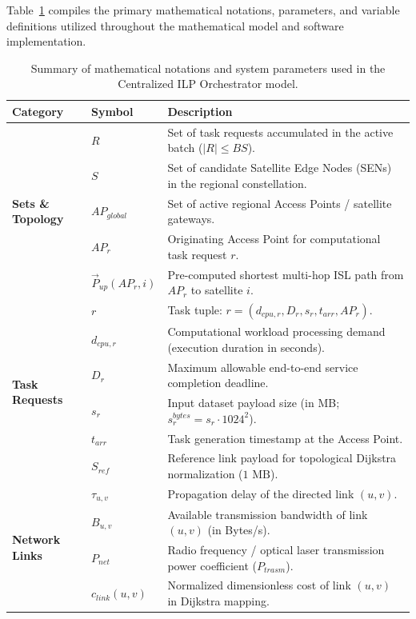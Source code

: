 Table~\ref{tab:system_notations} compiles the primary mathematical notations, parameters, and variable definitions utilized throughout the mathematical model and software implementation.

\begin{table}[htbp]
\centering
\small
\caption{Summary of mathematical notations and system parameters used in the Centralized ILP Orchestrator model.}
\label{tab:system_notations}
\begin{tabular}{@{}llp{9.2cm}@{}}
\toprule
\textbf{Category} & \textbf{Symbol} & \textbf{Description} \\
\midrule
\multirow{5}{*}{\textbf{Sets \& Topology}}
& $R$ & Set of task requests accumulated in the active batch ($|R| \le BS$). \\
& $S$ & Set of candidate Satellite Edge Nodes (SENs) in the regional constellation. \\
& $AP_{global}$ & Set of active regional Access Points / satellite gateways. \\
& $AP_r$ & Originating Access Point for computational task request $r$. \\
& $\vec{P}_{up}(AP_r, i)$ & Pre-computed shortest multi-hop ISL path from $AP_r$ to satellite $i$. \\
\midrule
\multirow{6}{*}{\textbf{Task Requests}}
& $r$ & Task tuple: $r = (d_{cpu,r}, D_r, s_r, t_{arr}, AP_r)$. \\
& $d_{cpu,r}$ & Computational workload processing demand (execution duration in seconds). \\
& $D_r$ & Maximum allowable end-to-end service completion deadline. \\
& $s_r$ & Input dataset payload size (in MB; $s_r^{bytes} = s_r \cdot 1024^2$). \\
& $t_{arr}$ & Task generation timestamp at the Access Point. \\
& $S_{ref}$ & Reference link payload for topological Dijkstra normalization ($1\text{ MB}$). \\
\midrule
\multirow{6}{*}{\textbf{Network Links}}
& $\tau_{u,v}$ & Propagation delay of the directed link $(u,v)$. \\
& $B_{u,v}$ & Available transmission bandwidth of link $(u,v)$ (in Bytes/s). \\
& $P_{net}$ & Radio frequency / optical laser transmission power coefficient ($P_{trasm}$). \\
& $c_{link}(u,v)$ & Normalized dimensionless cost of link $(u,v)$ in Dijkstra mapping. \\

\end{tabular}
\end{table}
